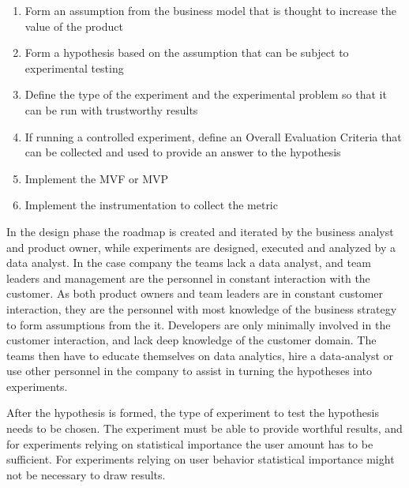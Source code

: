 \documentclass[english]{tktltiki2}
\theoremstyle{definition}
\theoremstyle{remark}
\begin{document}


\begin{enumerate}
  \item Form an assumption from the business model that is thought to increase the value of the product
  \item Form a hypothesis based on the assumption that can be subject to experimental testing 
  \item Define the type of the experiment and the experimental problem so that it can be run with trustworthy results
  \item If running a controlled experiment, define an Overall Evaluation Criteria that can be collected and used to provide an answer to the hypothesis  
  \item Implement the MVF or MVP
  \item Implement the instrumentation to collect the metric
\end{enumerate}

In the design phase the roadmap is created and iterated by the business analyst and product owner, while experiments are designed, executed and analyzed by a data analyst. In the case company the teams lack a data analyst, and team leaders and management are the personnel in constant interaction with the customer. As both product owners and team leaders are in constant customer interaction, they are the personnel with most knowledge of the business strategy to form assumptions from the it. Developers are only minimally involved in the customer interaction, and lack deep knowledge of the customer domain. The teams then have to educate themselves on data analytics, hire a data-analyst or use other personnel in the company to assist in turning the hypotheses into experiments. 

After the hypothesis is formed, the type of experiment to test the hypothesis needs to be chosen. The experiment must be able to provide worthful results, and for experiments relying on statistical importance the user amount has to be sufficient. For experiments relying on user behavior statistical importance might not be necessary to draw results.
\end{document}
